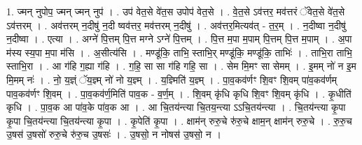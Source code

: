 \documentclass[17pt]{extarticle}
\begin{document}
1. ज्मन् नुपोप॒ ज्मन् ज्मन् नुप॑ । . उप॑ वेत॒से वे॑त॒स उपोप॑ वेत॒से । . वे॒त॒से ऽव॑त्तर॒ मव॑त्तरं ॅवेत॒से वे॑त॒से ऽव॑त्तरम् । . अव॑त्तरम् न॒दीषु॑ न॒दी ष्वव॑त्तर॒ मव॑त्तरम् न॒दीषु॑ । . अव॑त्तर॒मित्यव॑त् - त॒र॒म् । . न॒दीष्वा न॒दीषु॑ न॒दीष्वा । . एत्या । . अग्ने॑ पि॒त्तम् पि॒त्त मग्ने ऽग्ने॑ पि॒त्तम् । . पि॒त्त म॒पा म॒पाम् पि॒त्तम् पि॒त्त म॒पाम् । . अ॒पा म॑स्य स्य॒पा म॒पा म॑सि । . अ॒सीत्य॑सि । . मण्डू॑कि॒ ताभि॒ स्ताभि॒र् मण्डू॑कि॒ मण्डू॑कि॒ ताभिः॑ । . ताभि॒रा ताभि॒ स्ताभि॒रा । . आ ग॑हि ग॒ह्या ग॑हि । . ग॒हि॒ सा सा ग॑हि गहि॒ सा । . सेम मि॒मꣳ सा सेमम् । . इ॒मम् नो॑ न इ॒म मि॒मम् नः॑ । . नो॒ य॒ज्ञ्ं ॅय॒ज्ञ्म् नो॑ नो य॒ज्ञ्म् । . य॒ज्ञ्मिति॑ य॒ज्ञ्म् । . पा॒व॒कव॑र्णꣳ शि॒वꣳ शि॒वम् पा॑व॒कव॑र्णम् पाव॒कव॑र्णꣳ शि॒वम् । . पा॒व॒कव॑र्ण॒मिति॑ पाव॒क - व॒र्ण॒म् । . शि॒वम् कृ॑धि कृधि शि॒वꣳ शि॒वम् कृ॑धि । . कृ॒धीति॑ कृधि । . पा॒व॒क आ पा॑व॒के पा॑व॒क आ । . आ चि॒तय॑न्त्या चि॒तय॒न्त्या ऽऽचि॒तय॑न्त्या । . चि॒तय॑न्त्या कृ॒पा कृ॒पा चि॒तय॑न्त्या चि॒तय॑न्त्या कृ॒पा । . कृ॒पेति॑ कृ॒पा । . क्षाम॑न् रुरु॒चे रु॑रु॒चे क्षाम॒न् क्षाम॑न् रुरु॒चे । . रु॒रु॒च उ॒षस॑ उ॒षसो॑ रुरु॒चे रु॑रु॒च उ॒षसः॑ । . उ॒षसो॒ न नोषस॑ उ॒षसो॒ न । \newline
\end{document}
